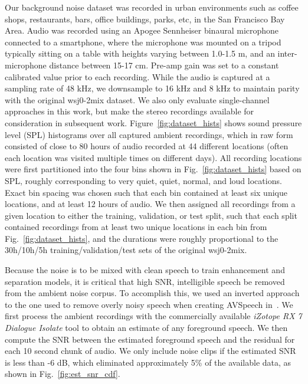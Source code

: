 \documentclass[a4paper]{article}
\begin{document}
Our background noise dataset was recorded in urban environments such as coffee shops, restaurants, bars, office buildings, parks, etc, in the San Francisco Bay Area.  Audio was recorded using an Apogee Sennheiser binaural microphone connected to a smartphone, where the microphone was mounted on a tripod typically sitting on a table with heights varying between 1.0-1.5 m, and an inter-microphone distance between 15-17 cm.  Pre-amp gain was set to a constant calibrated value prior to each recording.  While the audio is captured at a sampling rate of 48 kHz, we downsample to 16 kHz and 8 kHz to maintain parity with the original wsj0-2mix dataset.  We also only evaluate single-channel approaches in this work, but make the stereo recordings available for consideration in subsequent work. Figure~\ref{fig:dataset_hists} shows sound pressure level (SPL) histograms over all captured ambient recordings, which in raw form consisted of close to 80 hours of audio recorded at 44 different locations (often each location was visited multiple times on different days).  All recording locations were first partitioned into the four bins shown in Fig.~\ref{fig:dataset_hists} based on SPL, roughly corresponding to very quiet, quiet, normal, and loud locations.  Exact bin spacing was chosen such that each bin contained at least six unique locations, and at least 12 hours of audio.  We then assigned all recordings from a given location to either the training, validation, or test split, such that each split contained recordings from at least two unique locations in each bin from Fig.~\ref{fig:dataset_hists}, and the durations were roughly proportional to the 30h/10h/5h training/validation/test sets of the original wsj0-2mix.

Because the noise is to be mixed with clean speech to train enhancement and separation models, it is critical that high SNR, intelligible speech be removed from the ambient noise corpus.  To accomplish this, we used an inverted approach to the one used to remove overly noisy speech when creating AVSpeech in~\cite{ephrat2018looking}.  We first process the ambient recordings with the commercially available \emph{iZotope RX 7 Dialogue Isolate} tool to obtain an estimate of any foreground speech.  We then compute the SNR between the estimated foreground speech and the residual for each 10 second chunk of audio.  We only include noise clips if the estimated SNR is less than -6 dB, which eliminated approximately 5\%  of the available data, as shown in Fig.~\ref{fig:est_snr_cdf}.
\end{document}
